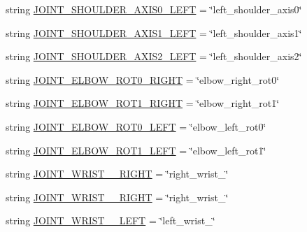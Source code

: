 \begin{DoxyCompactItemize}
string \mbox{\hyperlink{namespacesteering__trajectory__following__test_ae9645446475d21e458612d9e772eed58}{J\+O\+I\+N\+T\+\_\+\+S\+H\+O\+U\+L\+D\+E\+R\+\_\+\+A\+X\+I\+S0\+\_\+\+L\+E\+FT}} = \char`\"{}left\+\_\+shoulder\+\_\+axis0\char`\"{}
\item 
string \mbox{\hyperlink{namespacesteering__trajectory__following__test_a940cffedeae8e95eb444bc0976991024}{J\+O\+I\+N\+T\+\_\+\+S\+H\+O\+U\+L\+D\+E\+R\+\_\+\+A\+X\+I\+S1\+\_\+\+L\+E\+FT}} = \char`\"{}left\+\_\+shoulder\+\_\+axis1\char`\"{}
\item 
string \mbox{\hyperlink{namespacesteering__trajectory__following__test_a95784ab115aa92aafcfc54f38bcaafc2}{J\+O\+I\+N\+T\+\_\+\+S\+H\+O\+U\+L\+D\+E\+R\+\_\+\+A\+X\+I\+S2\+\_\+\+L\+E\+FT}} = \char`\"{}left\+\_\+shoulder\+\_\+axis2\char`\"{}
\item 
string \mbox{\hyperlink{namespacesteering__trajectory__following__test_abc51ae8ad86e5d9b21f7dd13b148d399}{J\+O\+I\+N\+T\+\_\+\+E\+L\+B\+O\+W\+\_\+\+R\+O\+T0\+\_\+\+R\+I\+G\+HT}} = \char`\"{}elbow\+\_\+right\+\_\+rot0\char`\"{}
\item 
string \mbox{\hyperlink{namespacesteering__trajectory__following__test_af35633e9dae72a4c4954547bf663230a}{J\+O\+I\+N\+T\+\_\+\+E\+L\+B\+O\+W\+\_\+\+R\+O\+T1\+\_\+\+R\+I\+G\+HT}} = \char`\"{}elbow\+\_\+right\+\_\+rot1\char`\"{}
\item 
string \mbox{\hyperlink{namespacesteering__trajectory__following__test_a6a7871c328a9f20e05eb0f3e5b59d76d}{J\+O\+I\+N\+T\+\_\+\+E\+L\+B\+O\+W\+\_\+\+R\+O\+T0\+\_\+\+L\+E\+FT}} = \char`\"{}elbow\+\_\+left\+\_\+rot0\char`\"{}
\item 
string \mbox{\hyperlink{namespacesteering__trajectory__following__test_a556a732fad8dbebfcc5ca994f802edc2}{J\+O\+I\+N\+T\+\_\+\+E\+L\+B\+O\+W\+\_\+\+R\+O\+T1\+\_\+\+L\+E\+FT}} = \char`\"{}elbow\+\_\+left\+\_\+rot1\char`\"{}
\item 
string \mbox{\hyperlink{namespacesteering__trajectory__following__test_a4ca6c59cd0baabbd4197019a8b0118ea}{J\+O\+I\+N\+T\+\_\+\+W\+R\+I\+S\+T\+\_\+\_\+\+R\+I\+G\+HT}} = \char`\"{}right\+\_\+wrist\+\_\char`\"{}
\item 
string \mbox{\hyperlink{namespacesteering__trajectory__following__test_a760ce96026a20c86c4729886030b45f9}{J\+O\+I\+N\+T\+\_\+\+W\+R\+I\+S\+T\+\_\+\_\+\+R\+I\+G\+HT}} = \char`\"{}right\+\_\+wrist\+\_\char`\"{}
\item 
string \mbox{\hyperlink{namespacesteering__trajectory__following__test_a3a58ea85a8bc020017166eb776399262}{J\+O\+I\+N\+T\+\_\+\+W\+R\+I\+S\+T\+\_\+\_\+\+L\+E\+FT}} = \char`\"{}left\+\_\+wrist\+\_\char`\"{}

\end{DoxyCompactItemize}
